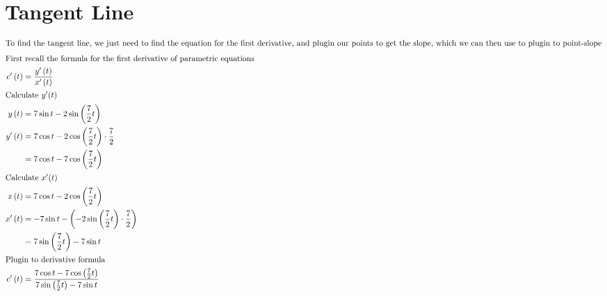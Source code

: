 \documentclass[12pt]{article}
\begin{document}
\section{Tangent Line}
\begin{align}
  \intertext{To find the tangent line, we just need to find the equation for the first derivative, and plugin our points to get the slope, which we can then use to plugin to point-slope}
  \intertext{First recall the formula for the first derivative of parametric equations }
  c'\left(t\right)          & =\frac{y'\left(t\right)}{x'\left(t\right)}                                                                                                                                           \\
  \intertext{Calculate $y'(t)$}
  y\left(t\right)           & =7\sin t-2\sin\left(\frac{7}{2}t\right)                                                                                                                                              \\
  y'\left(t\right)          & =7\cos t-2\cos\left(\frac{7}{2}t\right)\cdot\frac{7}{2}                                                                                                                              \\
                            & =7\cos t-7\cos\left(\frac{7}{2}t\right)                                                                                                                                              \\
  \intertext{Calculate $x'(t)$}
  x\left(t\right)           & =7\cos t-2\cos\left(\frac{7}{2}t\right)                                                                                                                                              \\
  x'\left(t\right)          & =-7\sin t-\left(-2\sin\left(\frac{7}{2}t\right)\cdot\frac{7}{2}\right)                                                                                                               \\
                            & =7\sin\left(\frac{7}{2}t\right)-7\sin t                                                                                                                                              \\
  \intertext{Plugin to derivative formula}
  c'\left(t\right)          & =\frac{7\cos t-7\cos\left(\frac{7}{2}t\right)}{7\sin\left(\frac{7}{2}t\right)-7\sin t}                                                                                               \\

\end{align}
\end{document}
